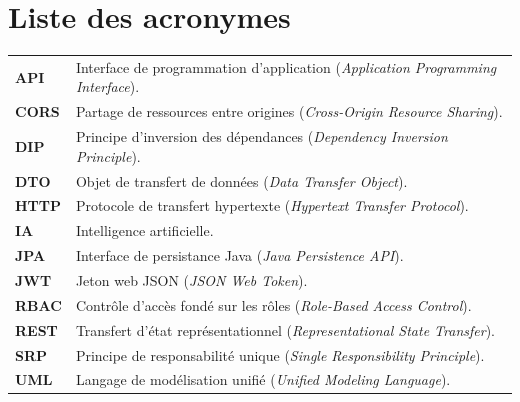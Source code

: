 \chapter*{Liste des acronymes}

\begin{tabular}{p{}p{}}
\textbf{API} & Interface de programmation d'application (\emph{Application Programming Interface}).\\[0.6em]
\textbf{CORS} & Partage de ressources entre origines (\emph{Cross-Origin Resource Sharing}).\\[0.6em]
\textbf{DIP} & {\raggedright Principe d'inversion des dépendances (\emph{Dependency Inversion Principle}).\par}\\[0.6em]
\textbf{DTO} & Objet de transfert de données (\emph{Data Transfer Object}).\\[0.6em]
\textbf{HTTP} & Protocole de transfert hypertexte (\emph{Hypertext Transfer Protocol}).\\[0.6em]
\textbf{IA} & Intelligence artificielle.\\[0.6em]
\textbf{JPA} & Interface de persistance Java (\emph{Java Persistence API}).\\[0.6em]
\textbf{JWT} & Jeton web JSON (\emph{JSON Web Token}).\\[0.6em]
\textbf{RBAC} & Contrôle d'accès fondé sur les rôles (\emph{Role-Based Access Control}).\\[0.6em]
\textbf{REST} & Transfert d'état représentationnel (\emph{Representational State Transfer}).\\[0.6em]
\textbf{SRP} & Principe de responsabilité unique (\emph{Single Responsibility Principle}).\\[0.6em]
\textbf{UML} & Langage de modélisation unifié (\emph{Unified Modeling Language}).
\end{tabular}
